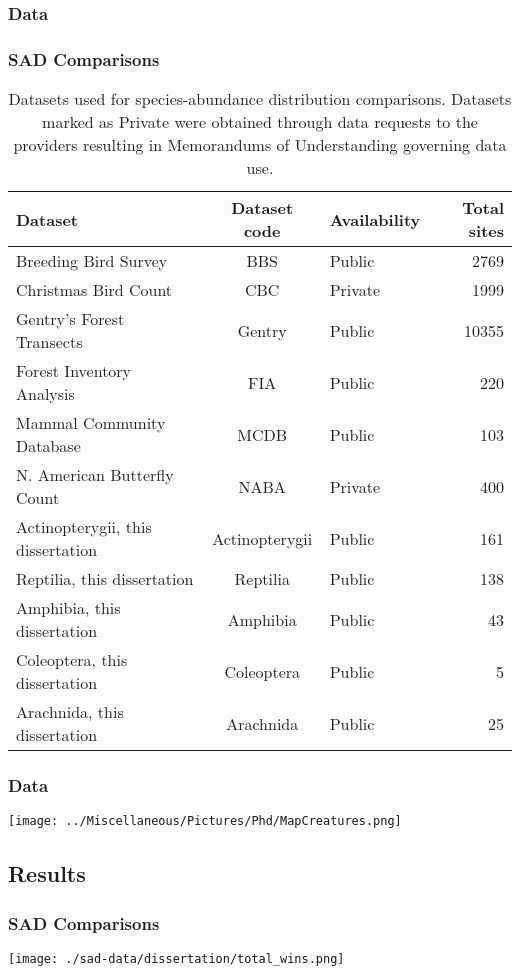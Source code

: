 \documentclass[14pt]{beamer}
\begin{document}
\subsubsection{Data}
\begin{frame}[shrink=35]
\frametitle{SAD Comparisons}
\begin{center}
\begin{table}
\begin{tabular}{l|c|l|r}
 Dataset &Dataset code &Availability &Total sites\\
\hline
 Breeding Bird Survey &BBS &Public &2769\\
 Christmas Bird Count &CBC &Private &1999\\
 Gentry's Forest Transects &Gentry &Public &10355\\
 Forest Inventory Analysis &FIA	 &Public &220\\
 Mammal Community Database &MCDB &Public &103\\
 N. American Butterfly Count &NABA &Private &400\\
 Actinopterygii, this dissertation	 &Actinopterygii &Public &161\\
 Reptilia, this dissertation &Reptilia &Public &138\\
 Amphibia, this dissertation &Amphibia &Public &43\\
 Coleoptera, this dissertation &Coleoptera &Public &5\\
 Arachnida, this dissertation &Arachnida &Public &25\\
\end{tabular}
\caption{Datasets used for species-abundance distribution comparisons. Datasets marked as Private were obtained through data requests to the providers resulting in Memorandums of Understanding governing data use.}
\end{table}
\end{center}
\end{frame}

\begin{frame}{}
\frametitle{Data}
\texttt{[image: ../Miscellaneous/Pictures/Phd/MapCreatures.png]}
\end{frame}


\subsection{Results}
\begin{frame}{}
\frametitle{SAD Comparisons}
\texttt{[image: ./sad-data/dissertation/total\_wins.png]}
\end{frame}
\end{document}
